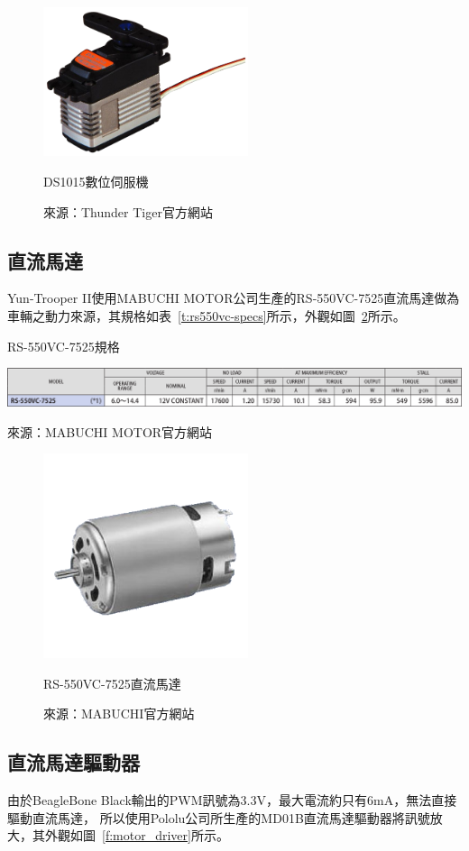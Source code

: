 \begin{figure}[h!]
	\centering
	\includegraphics[width=6cm]{figures/DS1015}
	\caption{DS1015數位伺服機}
	\caption*{來源：Thunder Tiger官方網站}
	\label{f:ds1015}
\end{figure}

\subsection{直流馬達}
Yun-Trooper II使用MABUCHI MOTOR公司生產的RS-550VC-7525直流馬達做為車輛之動力來源，其規格如表~\ref{t:rs550vc-specs}所示，外觀如圖~\ref{f:rs550vc}所示。

\begin{table}[h!]
	\centering
	\caption{RS-550VC-7525規格}
	\label{t:rs550vc-specs}
	\includegraphics[width=\textwidth]{tables/RS550VC-specs}
	\caption*{來源：MABUCHI MOTOR官方網站}
\end{table}

\begin{figure}[h!]
	\centering
	\includegraphics[width=6cm]{figures/motor}
	\caption{RS-550VC-7525直流馬達}
	\caption*{來源：MABUCHI官方網站}
	\label{f:rs550vc}
\end{figure}

\subsection{直流馬達驅動器}
由於BeagleBone Black輸出的PWM訊號為3.3V，最大電流約只有6mA，無法直接驅動直流馬達，
所以使用Pololu公司所生產的MD01B直流馬達驅動器將訊號放大，其外觀如圖~\ref{f:motor_driver}所示。

